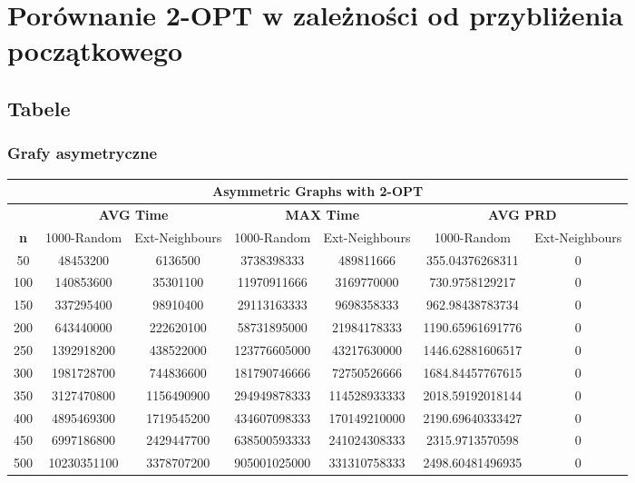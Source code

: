 \documentclass{article}
\begin{document}
\section{Porównanie 2-OPT w zależności od przybliżenia początkowego}
\subsection{Tabele}

\subsubsection{Grafy asymetryczne}

\begin{center}
\begin{tabular}{|c|c|c|c|c|c|c|}
\hline
\multicolumn{7}{|c|}{\textbf{Asymmetric Graphs with 2-OPT}}\\
\hline
 & \multicolumn{2}{|c|}{\textbf{AVG Time}} & \multicolumn{2}{|c|}{\textbf{MAX Time}} & \multicolumn{2}{|c|}{\textbf{AVG PRD}}\\
\hline
\textbf{n} & 1000-Random & Ext-Neighbours & 1000-Random & Ext-Neighbours & 1000-Random & Ext-Neighbours\\
\hline
50 & 48453200 & 6136500 & 3738398333 & 489811666 & 355.04376268311 & 0\\
\hline
100 & 140853600 & 35301100 & 11970911666 & 3169770000 & 730.9758129217 & 0\\
\hline
150 & 337295400 & 98910400 & 29113163333 & 9698358333 & 962.98438783734 & 0\\
\hline
200 & 643440000 & 222620100 & 58731895000 & 21984178333 & 1190.65961691776 & 0\\
\hline
250 & 1392918200 & 438522000 & 123776605000 & 43217630000 & 1446.62881606517 & 0\\
\hline
300 & 1981728700 & 744836600 & 181790746666 & 72750526666 & 1684.84457767615 & 0\\
\hline
350 & 3127470800 & 1156490900 & 294949878333 & 114528933333 & 2018.59192018144 & 0\\
\hline
400 & 4895469300 & 1719545200 & 434607098333 & 170149210000 & 2190.69640333427 & 0\\
\hline
450 & 6997186800 & 2429447700 & 638500593333 & 241024308333 & 2315.9713570598 & 0\\
\hline
500 & 10230351100 & 3378707200 & 905001025000 & 331310758333 & 2498.60481496935 & 0\\
\hline
\end{tabular}
\end{center}
\end{document}
